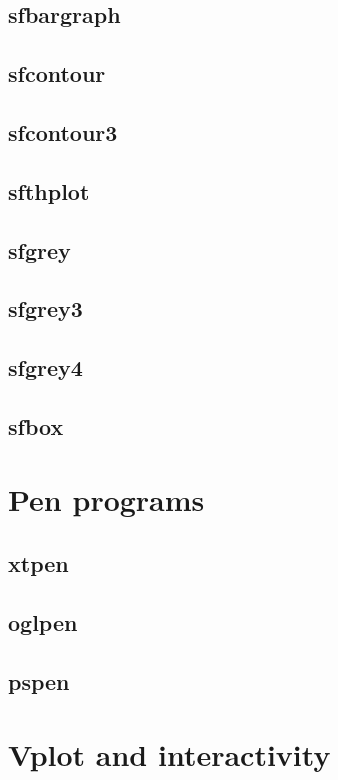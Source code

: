 \subsection{sfbargraph}

\subsection{sfcontour}

\subsection{sfcontour3}

\subsection{sfthplot}

\subsection{sfgrey}

\subsection{sfgrey3}

\subsection{sfgrey4}

\subsection{sfbox}

\section{Pen programs}

\subsection{xtpen}

\subsection{oglpen}

\subsection{pspen}

\section{Vplot and interactivity}



